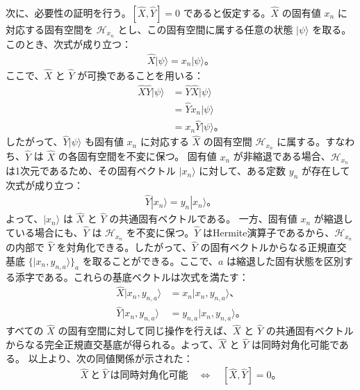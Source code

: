 \documentclass[platex,dvipdfmx,a4paper]{jsarticle}
\begin{document}
次に、必要性の証明を行う。$[\hat{X},\hat{Y}]=0$ であると仮定する。$\hat{X}$ の固有値 $x_n$ に対応する固有空間を $\mathcal{H}_{x_n}$ とし、この固有空間に属する任意の状態 $|\psi\rangle$ を取る。このとき、次式が成り立つ：
\begin{align*}
  \hat{X}|\psi\rangle=x_n|\psi\rangle。
\end{align*}
ここで、$\hat{X}$ と $\hat{Y}$ が可換であることを用いる：
\begin{align*}
  \hat{X}\hat{Y}|\psi\rangle
  &= \hat{Y}\hat{X}|\psi\rangle \\
  &= \hat{Y}x_n|\psi\rangle \\
  &= x_n\hat{Y}|\psi\rangle。
\end{align*}
したがって、$\hat{Y}|\psi\rangle$ も固有値 $x_n$ に対応する $\hat{X}$ の固有空間 $\mathcal{H}_{x_n}$ に属する。すなわち、$\hat{Y}$ は $\hat{X}$ の各固有空間を不変に保つ。
固有値 $x_n$ が非縮退である場合、$\mathcal{H}_{x_n}$ は1次元であるため、その固有ベクトル $|x_n\rangle$ に対して、ある定数 $y_n$ が存在して次式が成り立つ：
\begin{align*}
  \hat{Y}|x_n\rangle=y_n|x_n\rangle。
\end{align*}
よって、$|x_n\rangle$ は $\hat{X}$ と $\hat{Y}$ の共通固有ベクトルである。
一方、固有値 $x_n$ が縮退している場合にも、$\hat{Y}$ は $\mathcal{H}_{x_n}$ を不変に保つ。$\hat{Y}$ はHermite演算子であるから、$\mathcal{H}_{x_n}$ の内部で $\hat{Y}$ を対角化できる。したがって、$\hat{Y}$ の固有ベクトルからなる正規直交基底 $\{|x_n,y_{n,a}\rangle\}_a$ を取ることができる。ここで、$a$ は縮退した固有状態を区別する添字である。これらの基底ベクトルは次式を満たす：
\begin{align*}
  \hat{X}|x_n,y_{n,a}\rangle &= x_n|x_n,y_{n,a}\rangle、\\
  \hat{Y}|x_n,y_{n,a}\rangle &= y_{n,a}|x_n,y_{n,a}\rangle。
\end{align*}
すべての $\hat{X}$ の固有空間に対して同じ操作を行えば、$\hat{X}$ と $\hat{Y}$ の共通固有ベクトルからなる完全正規直交基底が得られる。よって、$\hat{X}$ と $\hat{Y}$ は同時対角化可能である。
以上より、次の同値関係が示された：
\begin{align*}
  \hat{X}\ \text{と}\ \hat{Y}\ \text{は同時対角化可能}
  \quad\Longleftrightarrow\quad
  [\hat{X},\hat{Y}]=0。
\end{align*}\\
\end{document}
